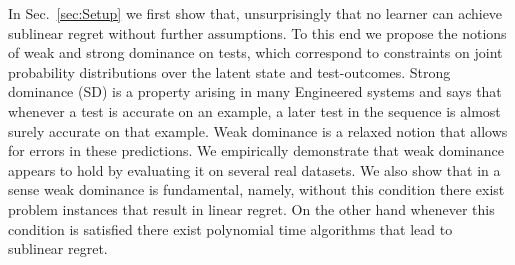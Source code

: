 

In Sec.~\ref{sec:Setup} we first show that, unsurprisingly that no learner can achieve sublinear regret without further assumptions. %
To this end we propose the notions of weak and strong dominance on tests, which correspond to constraints on joint probability distributions over the latent state and test-outcomes. Strong dominance (SD) is a property arising in many Engineered systems and says that whenever a test is accurate on an example, a later test in the sequence is almost surely accurate on that example. %
Weak dominance is a relaxed notion that allows for errors in these predictions. We empirically demonstrate that weak dominance appears to hold by evaluating it on several real datasets. We also show that in a sense weak dominance is fundamental, namely, without this condition there exist problem instances that result in linear regret. On the other hand whenever this condition is satisfied there exist polynomial time algorithms that lead to sublinear regret. 

